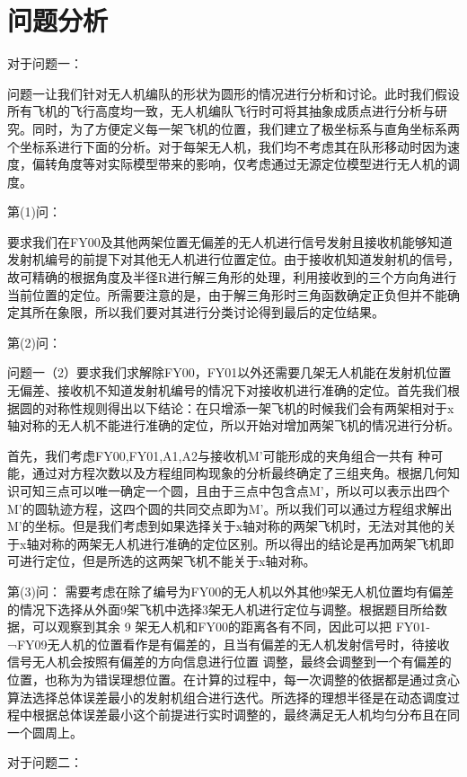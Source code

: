 \documentclass{cumcmthesis}
\begin{document}
\section{问题分析}
对于问题一：

问题一让我们针对无人机编队的形状为圆形的情况进行分析和讨论。此时我们假设所有飞机的飞行高度均一致，无人机编队飞行时可将其抽象成质点进行分析与研究。同时，为了方便定义每一架飞机的位置，我们建立了极坐标系与直角坐标系两个坐标系进行下面的分析。对于每架无人机，我们均不考虑其在队形移动时因为速度，偏转角度等对实际模型带来的影响，仅考虑通过无源定位模型进行无人机的调度。

第(1)问：

要求我们在FY00及其他两架位置无偏差的无人机进行信号发射且接收机能够知道发射机编号的前提下对其他无人机进行位置定位。由于接收机知道发射机的信号，故可精确的根据角度及半径R进行解三角形的处理，利用接收到的三个方向角进行当前位置的定位。所需要注意的是，由于解三角形时三角函数确定正负但并不能确定其所在象限，所以我们要对其进行分类讨论得到最后的定位结果。

第(2)问：

问题一（2）要求我们求解除FY00，FY01以外还需要几架无人机能在发射机位置无偏差、接收机不知道发射机编号的情况下对接收机进行准确的定位。首先我们根据圆的对称性规则得出以下结论：在只增添一架飞机的时候我们会有两架相对于x轴对称的无人机不能进行准确的定位，所以开始对增加两架飞机的情况进行分析。

首先，我们考虑FY00,FY01,A1,A2与接收机M’可能形成的夹角组合一共有 种可能，通过对方程次数以及方程组同构现象的分析最终确定了三组夹角。根据几何知识可知三点可以唯一确定一个圆，且由于三点中包含点M’，所以可以表示出四个M’的圆轨迹方程，这四个圆的共同交点即为M’。所以我们可以通过方程组求解出M’的坐标。但是我们考虑到如果选择关于x轴对称的两架飞机时，无法对其他的关于x轴对称的两架无人机进行准确的定位区别。所以得出的结论是再加两架飞机即可进行定位，但是所选的这两架飞机不能关于x轴对称。

第(3)问：
需要考虑在除了编号为FY00的无人机以外其他9架无人机位置均有偏差的情况下选择从外面9架飞机中选择3架无人机进行定位与调整。根据题目所给数据，可以观察到其余 9 架无人机和FY00的距离各有不同，因此可以把 FY01-¬FY09无人机的位置看作是有偏差的，且当有偏差的无人机发射信号时，待接收信号无人机会按照有偏差的方向信息进行位置 调整，最终会调整到一个有偏差的位置，也称为为错误理想位置。在计算的过程中，每一次调整的依据都是通过贪心算法选择总体误差最小的发射机组合进行迭代。所选择的理想半径是在动态调度过程中根据总体误差最小这个前提进行实时调整的，最终满足无人机均匀分布且在同一个圆周上。

对于问题二：
\end{document}
